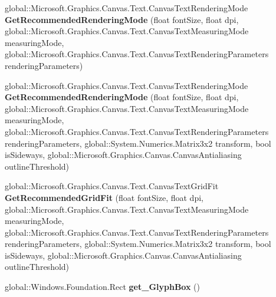 \begin{DoxyCompactItemize}
\item 
\mbox{\label{interface_microsoft_1_1_graphics_1_1_canvas_1_1_text_1_1_i_canvas_font_face_ae2ae5755a0eea0672afea0b62e974f44}} 
global\+::\+Microsoft.\+Graphics.\+Canvas.\+Text.\+Canvas\+Text\+Rendering\+Mode {\bfseries Get\+Recommended\+Rendering\+Mode} (float font\+Size, float dpi, global\+::\+Microsoft.\+Graphics.\+Canvas.\+Text.\+Canvas\+Text\+Measuring\+Mode measuring\+Mode, global\+::\+Microsoft.\+Graphics.\+Canvas.\+Text.\+Canvas\+Text\+Rendering\+Parameters rendering\+Parameters)
\item 
\mbox{\label{interface_microsoft_1_1_graphics_1_1_canvas_1_1_text_1_1_i_canvas_font_face_ad1b6a77bda7d882553aa0e86389e24c2}} 
global\+::\+Microsoft.\+Graphics.\+Canvas.\+Text.\+Canvas\+Text\+Rendering\+Mode {\bfseries Get\+Recommended\+Rendering\+Mode} (float font\+Size, float dpi, global\+::\+Microsoft.\+Graphics.\+Canvas.\+Text.\+Canvas\+Text\+Measuring\+Mode measuring\+Mode, global\+::\+Microsoft.\+Graphics.\+Canvas.\+Text.\+Canvas\+Text\+Rendering\+Parameters rendering\+Parameters, global\+::\+System.\+Numerics.\+Matrix3x2 transform, bool is\+Sideways, global\+::\+Microsoft.\+Graphics.\+Canvas.\+Canvas\+Antialiasing outline\+Threshold)
\item 
\mbox{\label{interface_microsoft_1_1_graphics_1_1_canvas_1_1_text_1_1_i_canvas_font_face_a700fd530e12faeab7d0ece47575bf53c}} 
global\+::\+Microsoft.\+Graphics.\+Canvas.\+Text.\+Canvas\+Text\+Grid\+Fit {\bfseries Get\+Recommended\+Grid\+Fit} (float font\+Size, float dpi, global\+::\+Microsoft.\+Graphics.\+Canvas.\+Text.\+Canvas\+Text\+Measuring\+Mode measuring\+Mode, global\+::\+Microsoft.\+Graphics.\+Canvas.\+Text.\+Canvas\+Text\+Rendering\+Parameters rendering\+Parameters, global\+::\+System.\+Numerics.\+Matrix3x2 transform, bool is\+Sideways, global\+::\+Microsoft.\+Graphics.\+Canvas.\+Canvas\+Antialiasing outline\+Threshold)
\item 
\mbox{\label{interface_microsoft_1_1_graphics_1_1_canvas_1_1_text_1_1_i_canvas_font_face_a11e8a01b93a2d69e738b14657ffc3bcd}} 
global\+::\+Windows.\+Foundation.\+Rect {\bfseries get\+\_\+\+Glyph\+Box} ()

\end{DoxyCompactItemize}

